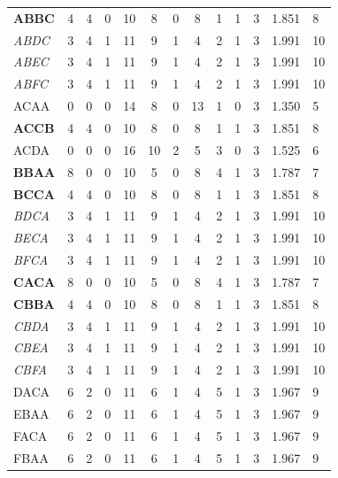 \documentclass[conference]{IEEEtran}
\begin{document}
\begin{table}[bht]
\begin{tabular}{|l|c|c|c|c|c|c|c|c|c|c|l|l|}
{\bf ABBC} &4 &4 &0 &10 &8 &0 &8 &1 &1 &3  & 1.851 & 8 \\
\textit{ ABDC  }&3 &4 &1 &11 &9 &1 &4 &2 &1 &3  & 1.991 & 10 \\
\textit{ ABEC  }&3 &4 &1 &11 &9 &1 &4 &2 &1 &3  & 1.991 & 10 \\
\textit{ ABFC  }&3 &4 &1 &11 &9 &1 &4 &2 &1 &3  & 1.991 & 10 \\
ACAA &0 &0 &0 &14 &8 &0 &13 &1 &0 &3  & 1.350 & 5 \\
{\bf ACCB} &4 &4 &0 &10 &8 &0 &8 &1 &1 &3  & 1.851 & 8 \\
ACDA &0 &0 &0 &16 &10 &2 &5 &3 &0 &3  & 1.525 & 6 \\
{\bf BBAA} &8 &0 &0 &10 &5 &0 &8 &4 &1 &3  & 1.787 & 7 \\
{\bf BCCA} &4 &4 &0 &10 &8 &0 &8 &1 &1 &3  & 1.851 & 8 \\
\textit{ BDCA  }&3 &4 &1 &11 &9 &1 &4 &2 &1 &3  & 1.991 & 10 \\
\textit{ BECA  }&3 &4 &1 &11 &9 &1 &4 &2 &1 &3  & 1.991 & 10 \\
\textit{ BFCA  }&3 &4 &1 &11 &9 &1 &4 &2 &1 &3  & 1.991 & 10 \\
{\bf CACA} &8 &0 &0 &10 &5 &0 &8 &4 &1 &3  & 1.787 & 7 \\
{\bf CBBA} &4 &4 &0 &10 &8 &0 &8 &1 &1 &3  & 1.851 & 8 \\
\textit{ CBDA  }&3 &4 &1 &11 &9 &1 &4 &2 &1 &3  & 1.991 & 10 \\
\textit{ CBEA  }&3 &4 &1 &11 &9 &1 &4 &2 &1 &3  & 1.991 & 10 \\
\textit{ CBFA  }&3 &4 &1 &11 &9 &1 &4 &2 &1 &3  & 1.991 & 10 \\
DACA &6 &2 &0 &11 &6 &1 &4 &5 &1 &3  & 1.967 & 9 \\
EBAA &6 &2 &0 &11 &6 &1 &4 &5 &1 &3  & 1.967 & 9 \\
FACA &6 &2 &0 &11 &6 &1 &4 &5 &1 &3  & 1.967 & 9 \\
FBAA &6 &2 &0 &11 &6 &1 &4 &5 &1 &3  & 1.967 & 9 \\
\hline
\end{tabular}
\end{table}
\end{document}
